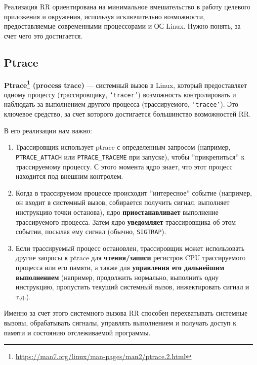 Реализация RR ориентирована на минимальное вмешательство в работу целевого
приложения и окружения, используя исключительно возможности, предоставляемые
современными процессорами и ОС Linux. Нужно понять, за счет чего это достигается.

\subsection{Ptrace}



\textbf{Ptrace\footnote{\url{https://man7.org/linux/man-pages/man2/ptrace.2.html}}
(process trace)} — системный вызов в Linux, который предоставляет одному
процессу (трассировщику, \texttt{`tracer'}) возможность контролировать и наблюдать за
выполнением другого процесса (трассируемого, \texttt{`tracee'}). Это ключевое средство,
за счет которого достигается большинство возможностей RR.

В его реализации нам важно:

\begin{enumerate}

  \item Трассировщик использует ptrace с определенным запросом (например,
  \texttt{PTRACE\_ATTACH} или \texttt{PTRACE\_TRACEME} при запуске), чтобы
  ''прикрепиться'' к трассируемому процессу. С этого момента ядро знает, что
  этот процесс находится под внешним контролем.

  \item Когда в трассируемом процессе происходит ''интересное'' событие
  (например, он входит в системный вызов, собирается получить сигнал, выполняет
  инструкцию точки останова), ядро \textbf{приостанавливает} выполнение
  трассируемого процесса. Затем ядро \textbf{уведомляет} трассировщика об этом
  событии, посылая ему сигнал (обычно, \texttt{SIGTRAP}).

  \item Если трассируемый процесс остановлен, трассировщик может использовать
  другие запросы к ptrace для \textbf{чтения/записи} регистров CPU трассируемого
  процесса или его памяти, а также для \textbf{управления его дальнейшим выполнением}
  (например, продолжить нормально, выполнить одну инструкцию, пропустить
  текущий системный вызов, инжектировать сигнал и т.д.).

\end{enumerate}

Именно за счет этого системного вызова RR способен перехватывать системные
вызовы, обрабатывать сигналы, управлять выполнением и получать доступ к памяти и
состоянию отслеживаемой программы.

